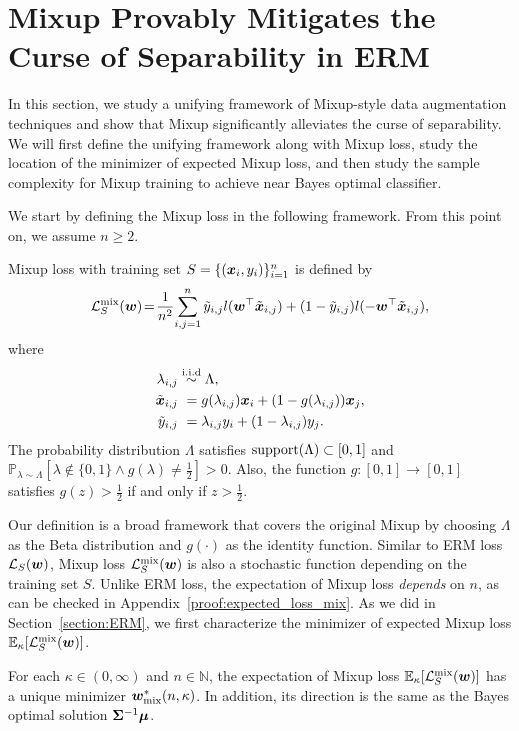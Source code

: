 \vspace{-5pt}
\section{Mixup Provably Mitigates the Curse of Separability in ERM}\label{section:mix}
In this section, we study a unifying framework of Mixup-style data augmentation techniques and show that Mixup significantly alleviates the curse of separability. 
We will first define the unifying framework along with Mixup loss, study the location of the minimizer of expected Mixup loss, and then study the sample complexity for Mixup training to achieve near Bayes optimal classifier.

We start by defining the Mixup loss in the following framework. From this point on, we assume $n\geq 2$.
\begin{definition} Mixup loss with training set $S = \{({\bm{x}}_i,y_i)\}_{i=1}^n$ is defined by
\begin{equation*}
 \mathcal{L}_S^\mathrm{mix}({\bm{w}}) \!=\! \frac{1}{n^2}\! \sum_{i,j=1}^n \tilde{y}_{i,j} l({\bm{w}}^\top \tilde{{\bm{x}}}_{i,j}) + (1-\tilde{y}_{i,j}) l(-{\bm{w}}^\top \tilde{{\bm{x}}}_{i,j}),
\end{equation*}
where
\begin{align*}
   \lambda_{i,j} &\overset{\mathrm{i.i.d}}{\sim} \Lambda,\\
   \tilde{{\bm{x}}}_{i,j} &~= g(\lambda_{i,j}) {\bm{x}}_i  + (1-g(\lambda_{i,j})){\bm{x}}_j, \\
   \tilde{y}_{i,j} &~= \lambda_{i,j} y_i  + (1-\lambda_{i,j})y_j.
\end{align*}
The probability distribution $\Lambda$ satisfies $\mathrm{support}(\Lambda) \subset [0,1]$ and $\mathbb{P}_{\lambda \sim \Lambda}\left [\lambda \notin \{ 0,1 \} \land g(\lambda) \neq \frac{1}{2}\right]>0$. Also, the function $g : [0,1] \rightarrow [0,1]$ satisfies $g(z)>\frac{1}{2}$ if and only if $z >\frac{1}{2}$.
\end{definition}
Our definition is a broad framework that covers the original Mixup by choosing $\Lambda$ as the Beta distribution and $g(\cdot)$ as the identity function.
Similar to ERM loss $\mathcal{L}_S ( {\bm{w}})$, Mixup loss $\mathcal{L}_S^\mathrm{mix}({\bm{w}})$ is also a stochastic function depending on the training set $S$. Unlike ERM loss, the expectation of Mixup loss \emph{depends} on $n$, as can be checked in Appendix~\ref{proof:expected_loss_mix}. As we did in Section~\ref{section:ERM}, we first characterize the minimizer of expected Mixup loss $\mathbb{E}_\kappa [\mathcal{L}_S^\mathrm{mix} ({\bm{w}})]$.
\begin{theorem}\label{thm:expected_loss_mix}
For each $\kappa \in (0,\infty)$ and $n \in \mathbb{N}$, the expectation of Mixup loss $\mathbb{E}_\kappa [\mathcal{L}_S^\mathrm{mix} ({\bm{w}})]$ has a unique minimizer ${\bm{w}}^*_\mathrm{mix}(n,\kappa)$. In addition, its direction is the same as the Bayes optimal solution ${\bm{\Sigma}}^{-1}{\bm{\mu}}$.
\vspace{-10pt}
\end{theorem}
